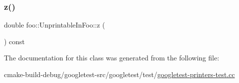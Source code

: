 \subsubsection{\texorpdfstring{z()}{z()}}
{\footnotesize\ttfamily double foo\+::\+Unprintable\+In\+Foo\+::z (\begin{DoxyParamCaption}{ }\end{DoxyParamCaption}) const\hspace{0.3cm}{\ttfamily [inline]}}



The documentation for this class was generated from the following file\+:\begin{DoxyCompactItemize}
\item 
cmake-\/build-\/debug/googletest-\/src/googletest/test/\mbox{\hyperlink{googletest-printers-test_8cc}{googletest-\/printers-\/test.\+cc}}\end{DoxyCompactItemize}
